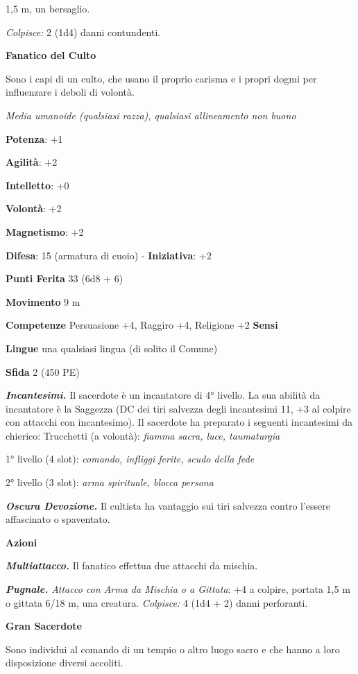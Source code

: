 \begin{multicols}{2}
1,5 m, un bersaglio.

\emph{Colpisce:} 2 (1d4) danni contundenti.


\textbf{Fanatico del Culto}

Sono i capi di un culto, che usano il proprio carisma e i propri dogmi
per influenzare i deboli di volontà.

\emph{Media umanoide (qualsiasi razza), qualsiasi allineamento non
buono}

\textbf{Potenza}: +1

\textbf{Agilità}: +2

\textbf{Intelletto}: +0

\textbf{Volontà}: +2

\textbf{Magnetismo}: +2

\textbf{Difesa}: 15 (armatura di cuoio) - \textbf{Iniziativa}: +2

\textbf{Punti Ferita} 33 (6d8 + 6)

\textbf{Movimento} 9 m

\textbf{Competenze} Persuasione +4, Raggiro +4, Religione +2 \textbf{Sensi}


\textbf{Lingue} una qualsiasi lingua (di solito il Comune)

\textbf{Sfida} 2 (450 PE)

\emph{\textbf{Incantesimi.}} Il sacerdote è un incantatore di 4°
livello. La sua abilità da incantatore è la Saggezza (DC dei tiri
salvezza degli incantesimi 11, +3 al colpire con attacchi con
incantesimo). Il sacerdote ha preparato i seguenti incantesimi da
chierico: Trucchetti (a volontà): \emph{fiamma sacra, luce, taumaturgia}

1° livello (4 slot): \emph{comando, infliggi ferite, scudo della fede}

2° livello (3 slot): \emph{arma spirituale, blocca persona}

\emph{\textbf{Oscura Devozione.}} Il cultista ha vantaggio sui tiri
salvezza contro l'essere affascinato o spaventato.

\textbf{Azioni}

\emph{\textbf{Multiattacco.}} Il fanatico effettua due attacchi da
mischia.

\emph{\textbf{Pugnale.} Attacco con Arma da Mischia o a Gittata}: +4 a
colpire, portata 1,5 m o gittata 6/18 m, una creatura. \emph{Colpisce:}
4 (1d4 + 2) danni perforanti.

\textbf{Gran Sacerdote}

Sono individui al comando di un tempio o altro luogo sacro e che hanno a
loro disposizione diversi accoliti.


\end{multicols}

